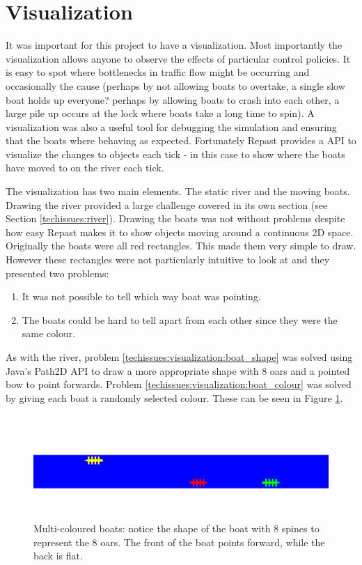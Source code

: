     \section{Visualization}
      It was important for this project to have a visualization. Most importantly the visualization allows anyone to observe the effects of particular control policies. It is easy to spot where bottlenecks in traffic flow might be occurring and occasionally the cause (perhaps by not allowing boats to overtake, a single slow boat holds up everyone? perhaps by allowing boats to crash into each other, a large pile up occurs at the lock where boats take a long time to spin). A visualization was also a useful tool for debugging the simulation and ensuring that the boats where behaving as expected. Fortunately Repast provides a API to visualize the changes to objects each tick - in this case to show where the boats have moved to on the river each tick.

      The visualization has two main elements. The static river and the moving boats. Drawing the river provided a large challenge covered in its own section (see Section \ref{techissues:river}). Drawing the boats was not without problems despite how easy Repast makes it to show objects moving around a continuous 2D space. Originally the boats were all red rectangles. This made them very simple to draw. However these rectangles were not particularly intuitive to look at and they presented two problems:
      \begin{enumerate}
        \item \label{techissues:visualization:boat_shape} It was not possible to tell which way boat was pointing.
        \item \label{techissues:visualization:boat_colour} The boats could be hard to tell apart from each other since they were the same colour. 
      \end{enumerate}
      As with the river, problem \ref{techissues:visualization:boat_shape} was solved using Java's Path2D API to draw a more appropriate shape with 8 oars and a pointed bow to point forwards. Problem \ref{techissues:visualization:boat_colour} was solved by giving each boat a randomly selected colour. These can be seen in Figure \ref{techissues:fig:boats}.

      \begin{figure}
      \begin{center}
        \includegraphics[scale=0.8]{images/boats.png}
        \caption{Multi-coloured boats: notice the shape of the boat with 8 spines to represent the 8 oars. The front of the boat points forward, while the back is flat.}
        \label{techissues:fig:boats}
      \end{center}
      \end{figure}
  
